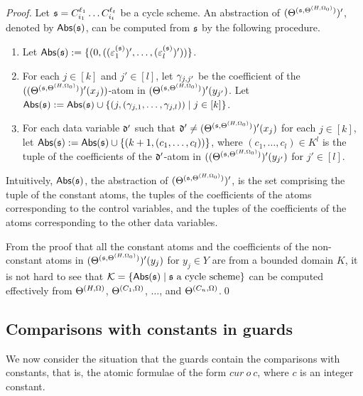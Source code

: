 \begin{appendix}
\begin{proof}
Let ${\mathfrak{s} }=C^{\ell_1}_{i_1} \dots C^{\ell_t}_{i_t}$ be a cycle scheme. An abstraction of $(\Theta^{({\mathfrak{s} },\Theta^{(H,\Omega_0)})})'$, denoted by $\mathsf{Abs}({\mathfrak{s} })$, can be computed from ${\mathfrak{s} }$ by the following procedure.
\begin{enumerate}
\item Let $\mathsf{Abs}({\mathfrak{s} }):=\{(0, ( (\varepsilon^{({\mathfrak{s} })}_{1})',\dots, (\varepsilon^{({\mathfrak{s} })}_l)'))\}$.
%
\item For each $j \in [k]$ and $j' \in [l]$, let $\gamma_{j, j'}$ be the coefficient of the $((\Theta^{({\mathfrak{s} },\Theta^{(H,\Omega_0)})})'(x_j))$-atom in $(\Theta^{({\mathfrak{s} },\Theta^{(H,\Omega_0)})})'(y_{j'})$. Let $\mathsf{Abs}({\mathfrak{s} }): = \mathsf{Abs}({\mathfrak{s} }) \cup \{(j, (\gamma_{j,1},\dots, \gamma_{j,l})) \mid j \in [k]\}$.
%
\item For each data variable $\mathfrak{d}'$ such that $\mathfrak{d}' \neq (\Theta^{({\mathfrak{s} },\Theta^{(H,\Omega_0)})})'(x_j)$ for each $j \in [k]$, let $\mathsf{Abs}({\mathfrak{s} }):=\mathsf{Abs}({\mathfrak{s} }) \cup \{(k+1, (c_1,\dots,c_l))\}$, where $(c_1,\dots,c_l) \in K^l$ is the tuple of the coefficients of the $\mathfrak{d}'$-atom in $((\Theta^{({\mathfrak{s} },\Theta^{(H,\Omega_0)})})'(y_{j'})$ for $j' \in [l]$. 
\end{enumerate}
Intuitively, $\mathsf{Abs}({\mathfrak{s} })$, the abstraction of  $(\Theta^{({\mathfrak{s} },\Theta^{(H,\Omega_0)})})'$,  is the set comprising the tuple of the constant atoms, the tuples of the coefficients of the atoms corresponding to the control variables, and the tuples of the coefficients of the atoms corresponding to the other data variables.

From the proof that all the constant atoms and the coefficients of the non-constant atoms in $(\Theta^{({\mathfrak{s} },\Theta^{(H,\Omega_0)})})'(y_j)$ for $y_j \in Y$ are from a bounded domain $K$, it is not hard to see that ${\mathcal{K}} = \{\mathsf{Abs}({\mathfrak{s} }) \mid {\mathfrak{s} } \mbox{ a cycle scheme}\}$ can be computed effectively from $\Theta^{(H,\Omega)}$, $\Theta^{(C_1,\Omega)}$, $\dots$, and $\Theta^{(C_n,\Omega)}$.\qed
\end{proof}


\subsection{Comparisons with constants in guards}

We now consider the situation that the guards contain the comparisons with constants, that is, the atomic formulae of the form $cur\ o\ c$, where $c$ is an integer constant. 


\end{appendix}
